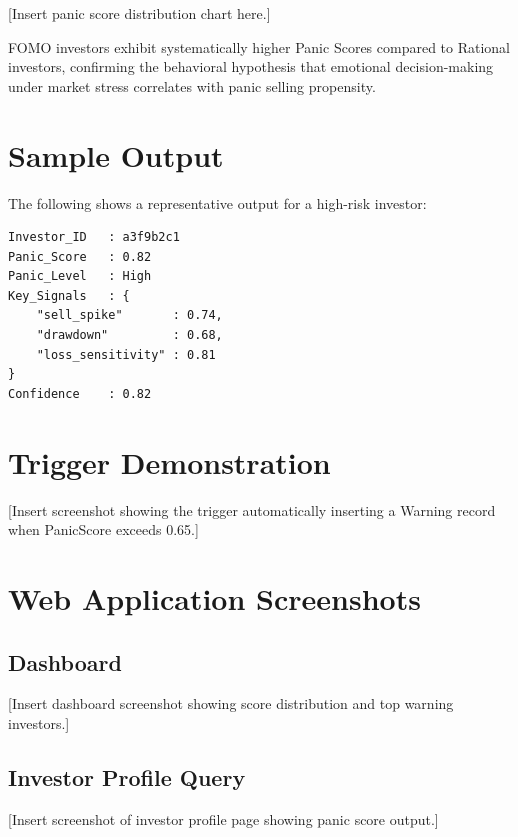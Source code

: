 [Insert panic score distribution chart here.]

FOMO investors exhibit systematically higher Panic Scores compared to Rational investors, confirming the behavioral hypothesis that emotional decision-making under market stress correlates with panic selling propensity.

\section{Sample Output}

The following shows a representative output for a high-risk investor:

\begin{lstlisting}[caption={Sample System Output — High Panic Investor}]
Investor_ID   : a3f9b2c1
Panic_Score   : 0.82
Panic_Level   : High
Key_Signals   : {
    "sell_spike"       : 0.74,
    "drawdown"         : 0.68,
    "loss_sensitivity" : 0.81
}
Confidence    : 0.82
\end{lstlisting}

\section{Trigger Demonstration}


[Insert screenshot showing the trigger automatically inserting a Warning record when PanicScore exceeds 0.65.]

\section{Web Application Screenshots}


\subsection{Dashboard}
[Insert dashboard screenshot showing score distribution and top warning investors.]

\subsection{Investor Profile Query}
[Insert screenshot of investor profile page showing panic score output.]

